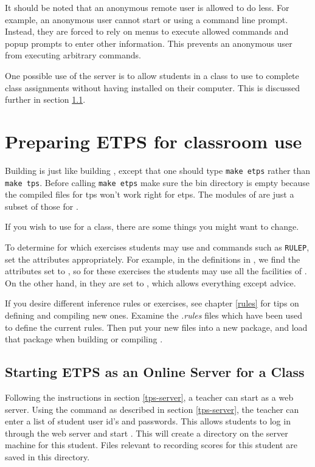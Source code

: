 It should be noted that an anonymous remote user is allowed to do less.
For example, an anonymous user cannot start {\TPS} or {\ETPS} using a command
line prompt.  Instead, they are forced to rely on menus to execute allowed
commands and popup prompts to enter other information.  This prevents
an anonymous user from executing arbitrary commands.

One possible use of the {\TPS} server is to allow students in a class
to use {\ETPS} to complete class assignments without having
{\ETPS} installed on their computer.  This is discussed further in
section \ref{etps-class-server}.

\section{Preparing ETPS for classroom use}

Building {\ETPS} is just like building {\TPS}, except that one should type {\tt make etps}
rather than {\tt make tps}.  Before calling {\tt make etps}
make sure the bin directory is empty because the compiled files for
tps won't work right for etps.
The modules of {\ETPS} are just a subset of those for {\TPS}.

If you wish to use {\ETPS} for a class, there are some things you might
want to change.

To determine for which exercises students may use
 and commands such as {\tt RULEP}, set the
 attributes appropriately. For example, in
the definitions in , we find the 
attributes set to , so for these exercises the
students may use all the facilities of {\ETPS}. On the other hand, in
 they are set to , which
allows everything except advice.

If you desire different inference rules or exercises, see chapter \ref{rules} for
tips on defining and compiling new ones.  Examine the {\it .rules} files
which have been used to define the current rules. Then put your new files into
a new {\TPS} package, and load that package when building or compiling
{\ETPS}.

\subsection{Starting ETPS as an Online Server for a Class}\label{etps-class-server}

Following the instructions in section \ref{tps-server}, a teacher
can start {\TPS} as a web server.  Using the command 
as described in section \ref{tps-server}, the teacher can enter
a list of student user id's and passwords.  This allows students to
log in through the {\TPS} web server and start {\ETPS}.  This will create
a directory on the server machine for this student.  Files relevant to
recording scores for this student are saved in this directory.

